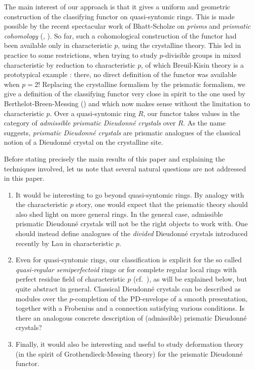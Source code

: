 \documentclass{amsart}
\theoremstyle{plain}
\theoremstyle{definition}
\newcommand{\red}[1]{{\color{black} #1}}
\begin{document}
The main interest of our approach is that it gives a uniform and geometric construction of the classifying functor on quasi-syntomic rings. This is made possible by the recent spectacular work of Bhatt-Scholze on \textit{prisms} and \textit{prismatic cohomology} (\cite{bhatt_scholze_prisms_and_prismatic_cohomology}, \cite{bhatt_lectures_on_prismatic_cohomology}). So far, such a cohomological construction of the functor had been available only in characteristic $p$, using the crystalline theory. This led in practice to some restrictions, when trying to study $p$-divisible groups in mixed characteristic by reduction to characteristic $p$, of which Breuil-Kisin theory is a prototypical example : there, no direct definition of the functor was available when $p=2$! Replacing the crystalline formalism by the prismatic formalism, we give a definition of the classifying functor very close in spirit to the one used by Berthelot-Breen-Messing (\cite{berthelot_breen_messing_theorie_de_dieudonne_cristalline_II}) and which now makes sense without the limitation to characteristic $p$. Over a quasi-syntomic ring $R$, our functor takes values in the category of \textit{\red{admissible} prismatic Dieudonn\'e crystals} over $R$.
As the name suggests, \textit{prismatic Dieudonn\'e crystals} are prismatic analogues of the classical notion of a Dieudonn\'e crystal on the crystalline site. 


Before stating precisely the main results of this paper and explaining the techniques involved, let us note that several natural questions are not addressed in this paper. 
\begin{enumerate}
\item It would be interesting to go beyond quasi-syntomic rings. By analogy with the characteristic $p$ story, one would expect that the prismatic theory should also shed light on more general rings. In the general case, \red{admissible} prismatic Dieudonn\'e crystals will not be the right objects to work with. One should instead define analogues of the \textit{divided} Dieudonn\'e crystals introduced recently by Lau \cite{lau_divided_dieudonne_crystals} in characteristic $p$.
\item Even for quasi-syntomic rings, our classification is explicit for the so called \textit{quasi-regular semiperfectoid} rings or for complete regular local rings with perfect residue field of characteristic $p$ (cf.\ ), as will be explained below, but quite abstract in general. Classical Dieudonn\'e crystals can be described as modules over the $p$-completion of the PD-envelope of a smooth presentation, together with a Frobenius and a connection satisfying various conditions. Is there an analogous concrete description of \red{(admissible)} prismatic Dieudonn\'e crystals?
\item Finally, it would also be interesting and useful to study deformation theory (in the spirit of Grothendieck-Messing theory) for the prismatic Dieudonn\'e functor. 
\end{enumerate}
\end{document}
